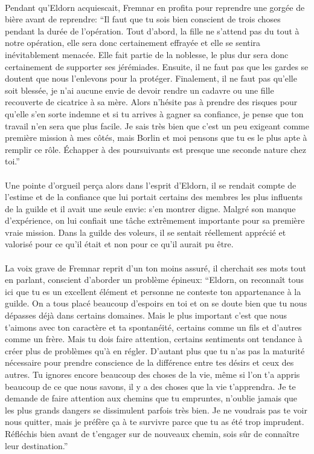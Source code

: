 \paragraph{}
Pendant qu'Eldorn acquiescait, Fremnar en profita pour reprendre une gorgée de
bière avant de reprendre: ``Il faut que tu sois bien conscient de trois choses
pendant la durée de l'opération. Tout d'abord, la fille ne s'attend pas du
tout à notre opération, elle sera donc certainement effrayée et elle se
sentira inévitablement menacée. Elle fait partie de la noblesse, le plus dur
sera donc certainement de supporter ses jérémiades. Ensuite, il ne faut pas
que les gardes se doutent que nous l'enlevons pour la protéger. Finalement, il
ne faut pas qu'elle soit blessée, je n'ai aucune envie de devoir rendre un
cadavre ou une fille recouverte de cicatrice à sa mère. Alors n'hésite pas à
prendre des risques pour qu'elle s'en sorte indemne et si tu arrives à gagner
sa confiance, je pense que ton travail n'en sera que plus facile. Je sais très
bien que c'est un peu exigeant comme première mission à mes côtés, mais Borlin
et moi pensons que tu es le plus apte à remplir ce rôle. Échapper à des
poursuivants est presque une seconde nature chez toi.''

\paragraph{}
Une pointe d'orgueil perça alors dans l'esprit d'Eldorn, il se rendait compte
de l'estime et de la confiance que lui portait certains des membres les plus
influents de la guilde et il avait une seule envie: s'en montrer digne. Malgré
son manque d'expérience, on lui confiait une tâche extrêmement importante pour
sa première vraie mission. Dans la guilde des voleurs, il se sentait
réellement apprécié et valorisé pour ce qu'il était et non pour ce qu'il
aurait pu être.

\paragraph{}
La voix grave de Fremnar reprit d'un ton moins assuré, il cherchait ses mots
tout en parlant, conscient d'aborder un problème épineux: ``Eldorn, on
reconnaît tous ici que tu es un excellent élément et personne ne conteste ton
appartenance à la guilde. On a tous placé beaucoup d'espoirs en toi et on se
doute bien que tu nous dépasses déjà dans certains domaines. Mais le plus
important c'est que nous t'aimons avec ton caractère et ta spontanéité,
certains comme un fils et d'autres comme un frère. Mais tu dois faire
attention, certains sentiments ont tendance à créer plus de problèmes qu'à en
régler. D'autant plus que tu n'as pas la maturité nécessaire pour prendre
conscience de la différence entre tes désirs et ceux des autres. Tu ignores
encore beaucoup des choses de la vie, même si l'on t'a appris beaucoup de ce
que nous savons, il y a des choses que la vie t'apprendra. Je te demande de
faire attention aux chemins que tu empruntes, n'oublie jamais que les plus
grands dangers se dissimulent parfois très bien. Je ne voudrais pas te voir
nous quitter, mais je préfère ça à te survivre parce que tu as été trop
imprudent. Réfléchis bien avant de t'engager sur de nouveaux chemin, sois sûr
de connaître leur destination.''

